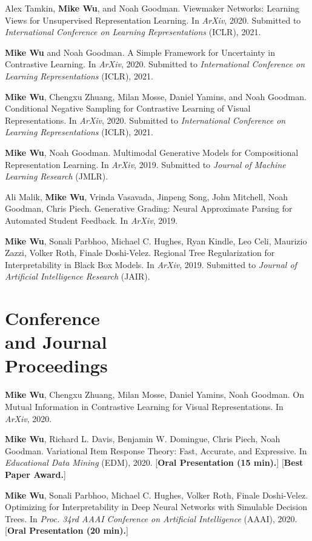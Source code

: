 \documentclass[margin, 10pt]{res} %
\begin{document}
\begin{resume}
Alex Tamkin, \textbf{Mike Wu}, and Noah Goodman. Viewmaker Networks: Learning Views for Unsupervised Representation Learning. In \textit{ArXiv}, 2020. Submitted to \textit{International Conference on Learning Representations} (ICLR), 2021.

\textbf{Mike Wu} and Noah Goodman. A Simple Framework for Uncertainty in Contrastive Learning. In \textit{ArXiv}, 2020. Submitted to \textit{International Conference on Learning Representations} (ICLR), 2021.

\textbf{Mike Wu}, Chengxu Zhuang, Milan Mosse, Daniel Yamins, and Noah Goodman. Conditional Negative Sampling for Contrastive Learning of Visual Representations. In \textit{ArXiv}, 2020. Submitted to \textit{International Conference on Learning Representations} (ICLR), 2021.

\textbf{Mike Wu}, Noah Goodman. Multimodal Generative Models for Compositional Representation Learning. In \textit{ArXiv}, 2019. Submitted to \textit{Journal of Machine Learning Research} (JMLR).

Ali Malik, \textbf{Mike Wu}, Vrinda Vasavada, Jinpeng Song, John Mitchell, Noah Goodman, Chris Piech. Generative Grading: Neural Approximate Parsing for Automated Student Feedback. In \textit{ArXiv}, 2019.

\textbf{Mike Wu}, Sonali Parbhoo, Michael C. Hughes, Ryan Kindle, Leo Celi, Maurizio Zazzi, Volker Roth, Finale Doshi-Velez. Regional Tree Regularization for Interpretability in Black Box Models. In \textit{ArXiv}, 2019. Submitted to \textit{Journal of Artificial Intelligence Research} (JAIR).

\section{Conference \\and Journal \\Proceedings}

\textbf{Mike Wu}, Chengxu Zhuang, Milan Mosse, Daniel Yamins, Noah Goodman. On Mutual Information in Contrastive Learning for Visual Representations. In \textit{ArXiv}, 2020.

\textbf{Mike Wu}, Richard L. Davis, Benjamin W. Domingue, Chris Piech, Noah Goodman. Variational Item Response Theory: Fast, Accurate, and Expressive. In \textit{Educational Data Mining} (EDM), 2020. [\textbf{Oral Presentation (15 min).}] [\textbf{Best Paper Award.}]

\textbf{Mike Wu}, Sonali Parbhoo, Michael C. Hughes, Volker Roth, Finale Doshi-Velez. Optimizing for Interpretability in Deep Neural Networks with Simulable Decision Trees. In \textit{Proc. 34rd AAAI Conference on Artificial Intelligence} (AAAI), 2020. [\textbf{Oral Presentation (20 min).}]


\end{resume}
\end{document}

